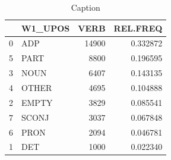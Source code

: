 \documentclass{article}
\begin{document}
\begin{table}[]
    \centering
    \begin{tabular}{llrr}
    \toprule
    {} & W1\_UPOS &   VERB &  REL.FREQ \\
    \midrule
    0 &     ADP &  14900 &  0.332872 \\
    5 &    PART &   8800 &  0.196595 \\
    3 &    NOUN &   6407 &  0.143135 \\
    4 &   OTHER &   4695 &  0.104888 \\
    2 &   EMPTY &   3829 &  0.085541 \\
    7 &   SCONJ &   3037 &  0.067848 \\
    6 &    PRON &   2094 &  0.046781 \\
    1 &     DET &   1000 &  0.022340 \\
    \bottomrule
    \end{tabular}
    \caption{Caption}
    \label{tab:fortsette_pos}
\end{table}




\newpage
% 
% 
\printbibliography
\end{document}
